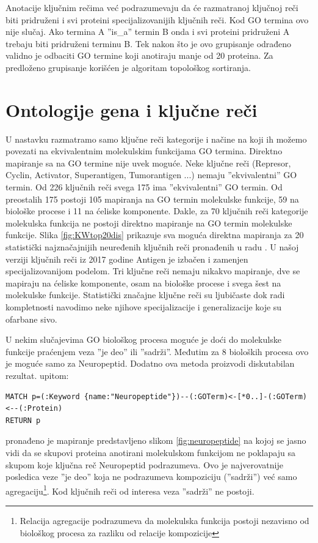 Anotacije ključnim rečima već podrazumevaju da će razmatranoj ključnoj reči
biti pridruženi i svi proteini specijalizovanijih ključnih reči. Kod GO
termina ovo nije slučaj. Ako termina A ''is\_a'' termin B onda i svi proteini
pridruženi A trebaju biti pridruženi terminu B. Tek nakon što je ovo grupisanje
odrađeno validno je odbaciti GO termine koji anotiraju manje od 20 proteina.
Za predloženo grupisanje korišćen je algoritam topološkog sortiranja.

\section{Ontologije gena i ključne reči}

U nastavku razmatramo samo ključne reči kategorije  i načine na koji ih možemo povezati na ekvivalentnim molekulskim
funkcijama GO termina.  Direktno mapiranje sa  na GO
termine nije uvek moguće.  Neke ključne reči (Represor, Cyclin, Activator,
Superantigen, Tumorantigen ...) nemaju ''ekvivalentni'' GO termin. Od 226
ključnih reči svega 175 ima ''ekvivalentni'' GO termin. Od preostalih 175
postoji 105 mapiranja  na GO termin molekulske funkcije, 59 na biološke procese
i 11 na ćeliske komponente.  Dakle, za 70 ključnih reči kategorije molekulska
funkcija ne postoji direktno mapiranje na GO termin molekulske funkcije. Slika
\ref{fig:KWtop20dis} prikazuje sva moguća direktna mapiranja za 20 statistički
najznačajnijih neuređenih ključnih reči pronađenih u radu \parencite{Xie2007}.
U našoj verziji ključnih reči iz 2017 godine Antigen je izbačen i zamenjen
specijalizovanijom podelom. Tri ključne reči nemaju nikakvo mapiranje, dve se
mapiraju na ćeliske komponente, osam na biološke procese i svega šest na
molekulske funkcije.  Statistički značajne ključne reči su ljubičaste dok radi
kompletnosti navodimo neke njihove specijalizacije i generalizacije koje su
ofarbane sivo.

U nekim slučajevima GO biološkog procesa moguće je doći do molekulske funkcije
praćenjem veza ''je deo'' ili ''sadrži''. Međutim za 8 bioloških procesa ovo je moguće samo za Neuropeptid.
Dodatno ova metoda proizvodi diskutabilan rezultat.  upitom:
\begin{verbatim}
MATCH p=(:Keyword {name:"Neuropeptide"})--(:GOTerm)<-[*0..]-(:GOTerm)<--(:Protein)
RETURN p
\end{verbatim}
pronađeno je mapiranje predstavljeno slikom \ref{fig:neuropeptide} na kojoj
se jasno vidi da se skupovi proteina anotirani molekulskom funkcijom
ne poklapaju sa skupom koje ključna reč Neuropeptid podrazumeva. Ovo je najverovatnije
posledica veze ''je deo'' koja ne podrazumeva kompoziciju (''sadrži'') već
samo agregaciju\footnote{ Relacija agregacije podrazumeva da molekulska
funkcija postoji nezavisno od biološkog procesa za razliku od relacije
kompozicije}. Kod ključnih reči od interesa veza ''sadrži'' ne postoji.

